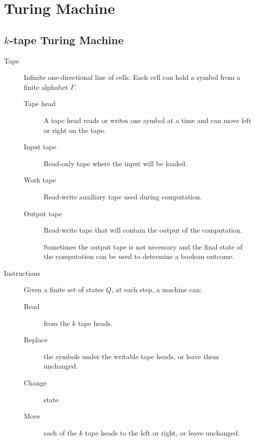 \chapter{Turing Machine}



\section{$k$-tape Turing Machine}

\begin{description}
    \item[Tape] 
        Infinite one-directional line of cells.
        Each cell can hold a symbol from a finite alphabet $\Gamma$.

        \begin{description}
            \item[Tape head]
                A tape head reads or writes one symbol at a time and 
                can move left or right on the tape.

            \item[Input tape]
                Read-only tape where the input will be loaded.

            \item[Work tape]
                Read-write auxiliary tape used during computation.

            \item[Output tape]
                Read-write tape that will contain the output of the computation.

                \begin{remark}
                    Sometimes the output tape is not necessary and the final state of the computation can be used to determine a boolean outcome.
                \end{remark}
        \end{description}

    \item[Instructions] 
        Given a finite set of states $Q$, at each step, a machine can:
        \begin{description}
            \item[Read] from the $k$ tape heads.
            \item[Replace] the symbols under the writable tape heads, or leave them unchanged.
            \item[Change] state.
            \item[Move] each of the $k$ tape heads to the left or right, or leave unchanged.
        \end{description}



\end{description}
